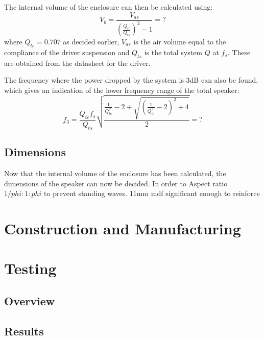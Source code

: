 \documentclass[main.tex]{subfiles}
\begin{document}
The internal volume of the enclosure can then be calculated using:
\begin{equation}
    V_b = \frac{V_{as}}{\left(\frac{Q_{tc}}{Q_{ts}}\right)^2-1}=?
\end{equation}
where $Q_{tc}=0.707$ as decided earlier, $V_{as}$ is the air volume equal to the compliance of the driver suspension and $Q_{ts}$ is the total system $Q$ at $f_s$.
These are obtained from the datasheet for the driver.

The frequency where the power dropped by the system is 3dB can also be found, which gives an indication of the lower frequency range of the total speaker:
\begin{equation}
    f_3 = \frac{Q_{tc}f_s}{Q_{ts}}\sqrt{\frac{\frac{1}{Q_{tc}^2}-2+\sqrt{\left(\frac{1}{Q_{tc}^2}-2\right)^2+4}}{2}}=?
\end{equation}
\subsection{Dimensions}
Now that the internal volume of the enclosure has been calculated, the dimensions of the speaker can now be decided.
In order to 
Aspect ratio $1/phi:1:phi$ to prevent standing waves.
11mm mdf significant enough to reinforce
\section{Construction and Manufacturing}
\section{Testing}
\subsection{Overview}
\subsection{Results}
\end{document}
